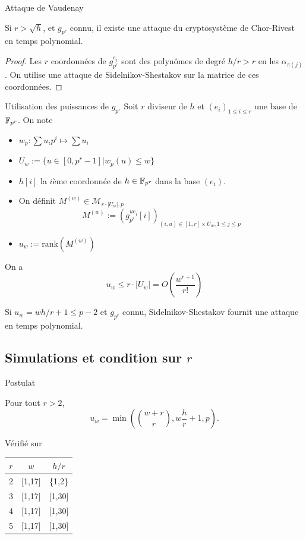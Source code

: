 \documentclass[]{beamer}
\begin{document}
\begin{frame}{Attaque de Vaudenay}
\begin{theorem}
Si $r > \sqrt{h}$, et $g_{p^r}$ connu, il existe une attaque du cryptosystème de Chor-Rivest en temps polynomial.
\end{theorem}
\begin{proof}
Les $r$ coordonnées de $g_{p^r}^{c_j}$ sont des polynômes de degré $h/r > r$ en les $\alpha_{\pi(j)}$.
On utilise une attaque de Sidelnikov-Shestakov sur la matrice de ces coordonnées.
\end{proof}
\end{frame}


\begin{frame}{Utilisation des puissances de $g_{p^r}$}
Soit $r$ diviseur de $h$ et $(e_i)_{1 \leq i \leq r}$ une base de $\mathbb{F}_{p^r}$. On note
\begin{itemize}
\item $w_p : \sum u_i p^i \mapsto \sum u_i$
\item $ U_w := \{ u \in [0,p^r-1] | w_p(u) \leq w \} $
\item $h[i]$ la $i$ème coordonnée de $h \in \mathbb{F}_{p^r}$ dans la base $(e_i)$.
\item On définit $M^{(w)} \in \mathcal{M}_{r \cdot |U_w|, p}$
$$ M^{(w)} := \left(g_{p^r}^{uc_j}[i] \right)_{(i,u) \in [1,r] \times U_w , 1 \leq j \leq p}$$
\item $u_w := \text{rank} \left( M^{(w)} \right)$
\end{itemize}
On a
$$ u_w \leq r \cdot |U_w| = O\left( \frac{w^{r+1}}{r!} \right) $$

\begin{theorem}
Si $u_w = wh/r+1 \leq p-2$ et $g_{p^r}$ connu, Sidelnikov-Shestakov fournit une attaque en temps polynomial.
\end{theorem}

\end{frame}


\subsection{Simulations et condition sur $r$}
\begin{frame}{Postulat}

\begin{postulate}
Pour tout $r > 2$,
$$ u_w = \min \left( \binom{w+r}{r}, w\frac{h}{r} + 1 , p \right).$$
\end{postulate}
Vérifié sur
\begin{center}
\begin{tabular}{|c|c|c|}
\hline
$r$ & $w$ 	& $h/r$ \\
\hline
2	& [1,17]	& \{1,2\}	\\
\hline
3	& [1,17]	& [1,30] \\
\hline
4	& [1,17]	& [1,30] \\
\hline
5	& [1,17]	& [1,30] \\
\hline
\end{tabular}
\end{center}
\end{frame}
\end{document}

